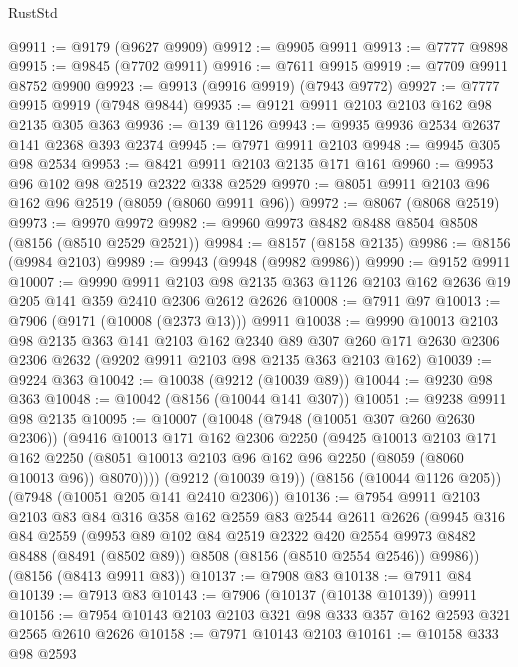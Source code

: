 \begin{lexlean}{RustStd}
\begin{coremodule}
{\begin{coremodule}
{{{{{{{{{{{{{{{{{{{{{{{{{{{{{{{{{{@9911 := @9179 (@9627 @9909)
@9912 := @9905 @9911
@9913 := @7777 @9898
@9915 := @9845 (@7702 @9911)
@9916 := @7611 @9915
@9919 := @7709 @9911 @8752 @9900
@9923 := @9913 (@9916 @9919) (@7943 @9772)
@9927 := @7777 @9915 @9919 (@7948 @9844)
@9935 := @9121 @9911 @2103 @2103 @162 @98 @2135 @305 @363
@9936 := @139 @1126
@9943 := @9935 @9936 @2534 @2637 @141 @2368 @393 @2374
@9945 := @7971 @9911 @2103
@9948 := @9945 @305 @98 @2534
@9953 := @8421 @9911 @2103 @2135 @171 @161
@9960 := @9953 @96 @102 @98 @2519 @2322 @338 @2529
@9970 := @8051 @9911 @2103 @96 @162 @96 @2519 (@8059 (@8060 @9911 @96))
@9972 := @8067 (@8068 @2519)
@9973 := @9970 @9972
@9982 := @9960 @9973 @8482 @8488 @8504 @8508 (@8156 (@8510 @2529 @2521))
@9984 := @8157 (@8158 @2135)
@9986 := @8156 (@9984 @2103)
@9989 := @9943 (@9948 (@9982 @9986))
@9990 := @9152 @9911
@10007 := @9990
    @9911
    @2103
    @98
    @2135
    @363
    @1126
    @2103
    @162
    @2636
    @19
    @205
    @141
    @359
    @2410
    @2306
    @2612
    @2626
@10008 := @7911 @97
@10013 := @7906 (@9171 (@10008 (@2373 @13))) @9911
@10038 := @9990
    @10013
    @2103
    @98
    @2135
    @363
    @141
    @2103
    @162
    @2340
    @89
    @307
    @260
    @171
    @2630
    @2306
    @2306
    @2632
    (@9202 @9911 @2103 @98 @2135 @363 @2103 @162)
@10039 := @9224 @363
@10042 := @10038 (@9212 (@10039 @89))
@10044 := @9230 @98 @363
@10048 := @10042 (@8156 (@10044 @141 @307))
@10051 := @9238 @9911 @98 @2135
@10095 := @10007
    (@10048
      (@7948 (@10051 @307 @260 @2630 @2306))
      (@9416
        @10013
        @171
        @162
        @2306
        @2250
        (@9425
          @10013
          @2103
          @171
          @162
          @2250
          (@8051 @10013 @2103 @96 @162 @96 @2250 (@8059 (@8060 @10013 @96)) @8070))))
    (@9212 (@10039 @19))
    (@8156 (@10044 @1126 @205))
    (@7948 (@10051 @205 @141 @2410 @2306))
@10136 := @7954
    @9911
    @2103
    @2103
    @83
    @84
    @316
    @358
    @162
    @2559
    @83
    @2544
    @2611
    @2626
    (@9945
      @316
      @84
      @2559
      (@9953
        @89
        @102
        @84
        @2519
        @2322
        @420
        @2554
        @9973
        @8482
        @8488
        (@8491 (@8502 @89))
        @8508
        (@8156 (@8510 @2554 @2546))
        @9986))
    (@8156 (@8413 @9911 @83))
@10137 := @7908 @83
@10138 := @7911 @84
@10139 := @7913 @83
@10143 := @7906 (@10137 (@10138 @10139)) @9911
@10156 := @7954 @10143 @2103 @2103 @321 @98 @333 @357 @162 @2593 @321 @2565 @2610 @2626
@10158 := @7971 @10143 @2103
@10161 := @10158 @333 @98 @2593
}}}}}}}}}}}}}}}}}}}}}}}}}}}}}}}}}}
\end{coremodule}}
\end{coremodule}
\end{lexlean}
